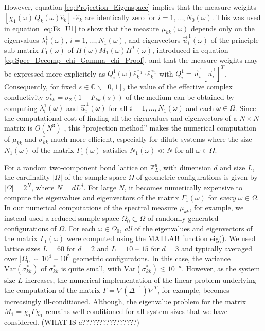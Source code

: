 \documentclass{cmslatex}
\begin{document}
However, equation \eqref{eq:Projection_Eigenspace} implies that the
measure weights $[\chi_1(\omega)\,Q_k(\omega)\hat{e}_k]\cdot\hat{e}_k$ are 
identically zero for $i=1,\ldots,N_0(\omega)$. This was used in equation
\eqref{eq:Fs_U1} to show that the measure $\mu_{kk}(\omega)$ depends only on
the eigenvalues $\lambda^1_i(\omega)$, $i=1,\ldots,N_1(\omega)$, and eigenvectors
$\vec{u}^{\,1}_i(\omega)$ of the principle sub-matrix $\Gamma_1(\omega)$ of
$\Pi(\omega)M_1(\omega)\Pi^T(\omega)$, introduced in 
equation \eqref{eq:Spec_Decomp_chi_Gamma_chi_Proof}, and that the
measure weights may be expressed more explicitely as
$Q^1_i(\omega)\hat{e}_k^{\,\pi_1}\cdot\hat{e}_k^{\,\pi_1}$ with 
$Q^1_i=\vec{u}^{\,1}_i[\vec{u}^{\,1}_i]^T$.  Consequently,
for fixed $s\in\mathbb{C}\backslash[0,1]$, the value of
the effective complex conductivity $\sigma^*_{kk}=\sigma_2(1-F_{kk}(s))$ of
the medium can be obtained by computing $\lambda^1_i(\omega)$ and
$\vec{u}^{\,1}_i(\omega)$ for all $i=1,\ldots,N_1(\omega)$ and each $\omega\in\Omega$. Since the
computational cost of finding all the eigenvalues and eigenvectors of
a $N\times N$ matrix is $O(N^3)$ \cite{Demmel:1997}, this ``projection
method'' makes the numerical computation of $\mu_{kk}$ and $\sigma^*_{kk}$
much more efficient, especially for dilute systems where the size
$N_1(\omega)$ of the matrix $\Gamma_1(\omega)$ satisfies $N_1(\omega)\ll N$ for all $\omega\in\Omega$.   


For a random two-component bond lattice on $\mathbb{Z}^d_L$, with
dimension $d$ and size $L$, the cardinality $|\Omega|$ of the sample space
$\Omega$ of geometric configurations is 
given by $|\Omega|=2^N$, where $N=dL^d$. For large $N$, it
becomes numerically expensive to compute the eigenvalues and
eigenvectors of the matrix $\Gamma_1(\omega)$ for \emph{every} $\omega\in\Omega$. In our
numerical computations of the spectral measure $\mu_{kk}$, for example,
we instead used a reduced sample space $\Omega_0\subset\Omega$ of randomly generated
configurations of $\Omega$. For each $\omega\in\Omega_0$, \emph{all} of the eigenvalues
and eigenvectors of the matrix $\Gamma_1(\omega)$ were computed using the MATLAB
function eig(). We used lattice sizes $L=60$ for $d=2$ and
$L=10$ -- $15$ for  
$d=3$ and typically averaged over $|\Omega_0|\sim10^4$ -- $10^5$ geometric
configuratons. In this case, the variance $\text{Var}(\sigma^*_{kk})$ of
$\sigma^*_{kk}$ is quite small, with
$\text{Var}(\sigma^*_{kk})\lesssim10^{-a}$. However, as the system size $L$
increases, the numerical implementation of the linear problem 
underlying the computation of the matrix $\Gamma=\nabla(\Delta^{-1})\nabla^T$, for
example, becomes increasingly ill-conditioned. Although, the
eigenvalue problem for the matrix $M_1=\chi_1\Gamma\chi_1$ remains well
conditioned for all system sizes that we have considered.
(WHAT IS $a$????????????????)
\end{document}
